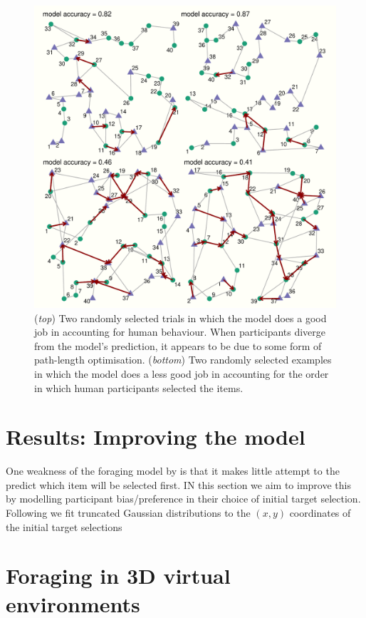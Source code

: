 \documentclass[vision,article,submit,pdftex,moreauthors]{Definitions/mdpi}
\begin{document}
\begin{figure}[H]
\centering
\includegraphics[width=12 cm]{Figures/qjep_ex_paths.pdf}
\caption{(\textit{top}) Two randomly selected trials in which the model does a good job in accounting for human behaviour. When participants diverge from the model's prediction, it appears to be due to some form of path-length optimisation. (\textit{bottom}) Two randomly selected examples in which the model does a less good job in accounting for the order in which human participants selected the items.}
\label{fig:qjep_paths}
\end{figure} 

\section{Results: Improving the model}

One weakness of the foraging model by \cite{clarke2022foraging} is that it makes little attempt to the predict which item will be selected first. IN this section we aim to improve this by modelling participant bias/preference in their choice of initial target selection. Following \cite{clarke_tatler2014, clarke2017} we fit truncated Gaussian distributions to the $(x,y)$ coordinates of the initial target selections 




\section{Foraging in 3D virtual environments}
\end{document}
